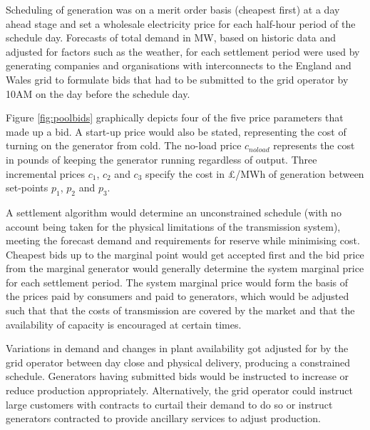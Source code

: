Scheduling of generation was on a merit order basis (cheapest first) at a day
ahead stage and set a wholesale electricity price for each half-hour period of
the schedule day.  Forecasts of total demand in MW, based on historic data and
adjusted for factors such as the weather, for each settlement period were used
by generating companies and organisations with interconnects to the England
and Wales grid to formulate bids that had to be submitted to the grid operator
by 10AM on the day before the schedule day.

%

Figure \ref{fig:poolbids} graphically depicts four of the five price parameters
that made up a bid.  A start-up price would also be stated, representing the
cost of turning on the generator from cold.  The no-load price $c_{noload}$
represents the cost in pounds of keeping the generator running regardless of output. Three
incremental prices $c_1$, $c_2$ and $c_3$ specify the cost in \pounds/MWh of
generation between set-points $p_1$, $p_2$ and $p_3$.

A settlement algorithm would determine an unconstrained schedule
(with no account being taken for the physical limitations of the transmission
system), meeting the forecast demand and requirements for reserve while minimising cost.
Cheapest bids up to the marginal point would get accepted first and the bid
price from the marginal generator would generally determine the system marginal
price for each settlement period.  The system marginal price would form the
basis of the prices paid by consumers and paid to generators, which would be
adjusted such that that the costs of transmission are covered by the market and that the
availability of capacity is encouraged at certain times.

Variations in demand and changes in plant availability got adjusted for by
the grid operator between day close and physical delivery, producing a
constrained schedule. Generators having submitted bids would be instructed to
increase or reduce production appropriately.  Alternatively, the grid operator
could instruct large customers with contracts to curtail their demand to do so
or instruct generators contracted to provide ancillary services to adjust
production.

